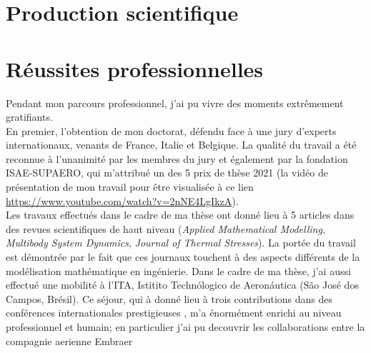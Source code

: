 \documentclass[12pt, french]{article}
\begin{document}
	
	\section{Production scientifique}
	{
		
		
	}
	
	
	\section{Réussites professionnelles}
	
	Pendant mon parcours professionnel, j'ai pu vivre des moments extrêmement gratifiants. \\
	
	En premier, l'obtention de mon doctorat, défendu face à une jury d'experts internationaux, venants de France, Italie et Belgique. La qualité du travail a été reconnue à l'unanimité par les membres du jury et également par la fondation ISAE-SUPAERO, qui m'attribué un des 5 prix de thèse 2021 (la vidéo de présentation de mon travail pour être visualisée à ce lien \url{https://www.youtube.com/watch?v=2nNE4LgIkzA}). \\
	
	Les travaux effectués dans le cadre de ma thèse ont donné lieu à 5 articles dans des revues scientifiques de haut niveau  (\textit{Applied Mathematical Modelling}, \textit{Multibody System Dynamics}, \textit{Journal of Thermal Stresses}). La portée du travail est démontrée par le fait que ces journaux touchent à des aspects différents de la modélisation mathématique en ingénierie. Dans le cadre de ma thèse, j'ai aussi effectué une  mobilité à l'ITA, Istitito Techn\'ologico de Aeron\'autica (São José dos Campos, Brésil). Ce séjour, qui à donné lieu à trois contributions dans des conférences internationales prestigieuses , m'a énormément enrichi au niveau professionnel et humain; en particulier j'ai pu decouvrir les collaborations entre la compagnie aerienne Embraer \\
	
\end{document}
